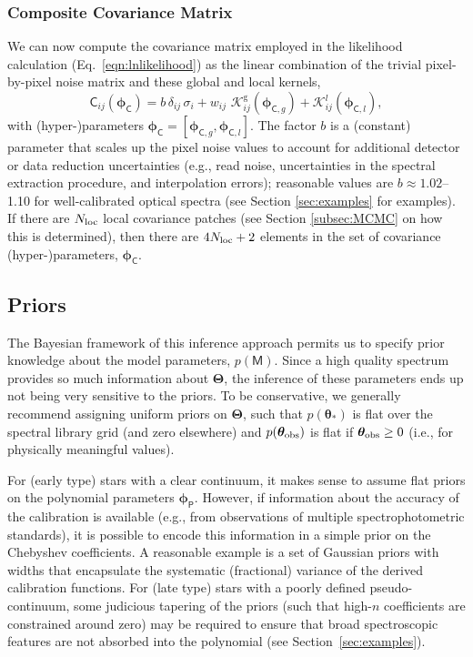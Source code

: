 \documentclass[iop,floatfix]{emulateapj}
\newcommand{\vM}{\mathsf{M}}
\newcommand{\vC}{\mathsf{C}}
\newcommand{\vt}{ {\bm \theta}}
\newcommand{\vT}{ {\bm \Theta}}
\newcommand{\vp}{ {\bm \phi}}
\newcommand{\cheb}{ \vp_{\mathsf{P}}}
\newcommand{\cov}{ \vp_{\mathsf{C}}}
\newcommand{\KK}{\mathcal{K}}
\newcommand{\Kglobal}{\KK^{\textrm{g}}}
\newcommand{\Klocal}{\KK^l}
\begin{document}
\subsubsection{Composite Covariance Matrix}

We can now compute the covariance matrix employed in the likelihood calculation 
(Eq.~\ref{eqn:lnlikelihood}) as the linear combination of the trivial pixel-by-pixel noise matrix 
and these global and local kernels, 
\begin{equation}
\vC_{ij}(\cov)  = b \, \delta_{ij} \, \sigma_i + w_{ij} \,\, \Kglobal_{ij}(\vp_{{\mathsf C}, g}) + 
                  \Klocal_{ij}(\vp_{{\mathsf C}, l}), 
\end{equation}
with (hyper-)parameters $\cov = [\vp_{{\mathsf C}, g}, \vp_{{\mathsf C}, l}]$.  The factor $b$ is 
a (constant) parameter that scales up the pixel noise values to account for additional detector or 
data reduction uncertainties (e.g., read noise, uncertainties in the spectral extraction procedure, 
and interpolation errors); reasonable values are $b \approx 1.02$--1.10 for well-calibrated optical 
spectra (see Section \ref{sec:examples} for examples).  If there are $N_{\rm loc}$ local covariance 
patches (see Section \ref{subsec:MCMC} on how this is determined), then there are $4N_{\rm loc}+2$ 
elements in the set of covariance (hyper-)parameters, $\cov$.  

\subsection{Priors} \label{subsec:priors}

The Bayesian framework of this inference approach permits us to specify prior knowledge about the 
model parameters, $p(\vM)$.  Since a high quality spectrum provides so much information about 
$\vT$, the inference of these parameters ends up not being very sensitive to the priors.  To be 
conservative, we generally recommend assigning uniform priors on $\vT$, such that $p(\vt_{\ast})$
is flat over the spectral library grid (and zero elsewhere) and $p(\vt_{\rm obs})$ is flat if 
$\vt_{\rm obs} \ge 0$ (i.e., for physically meaningful values).  

For (early type) stars with a clear continuum, it makes sense to assume flat priors on the 
polynomial parameters $\cheb$.  However, if information about the accuracy of the calibration is 
available (e.g., from observations of multiple spectrophotometric standards), it is possible to 
encode this information in a simple prior on the Chebyshev coefficients.  A reasonable example is a 
set of Gaussian priors with widths that encapsulate the systematic (fractional) variance of the 
derived calibration functions.  For (late type) stars with a poorly defined pseudo-continuum, 
some judicious tapering of the priors (such that high-$n$ coefficients are constrained around zero) 
may be required to ensure that broad spectroscopic features are not absorbed into the polynomial 
(see Section~\ref{sec:examples}). 
\end{document}
